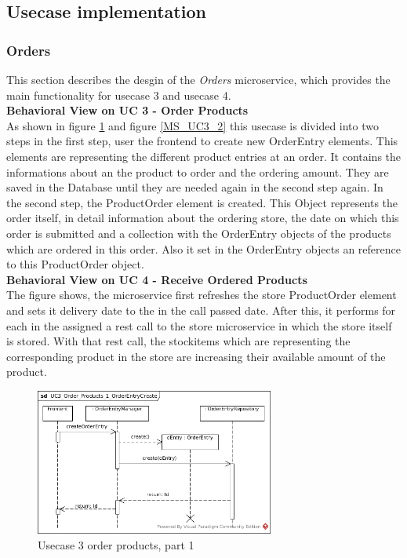 	\subsection{Usecase implementation}\label{UsecaseSection}
	\FloatBarrier
		\subsubsection{Orders}
		This section describes the desgin of the \textit{Orders} microservice, which provides the main functionality for usecase 3 and usecase 4.\\
		
		\textbf{Behavioral View on UC 3 - Order Products} \\
		As shown in figure \ref{MS_UC3_1} and figure \ref{MS_UC3_2} this usecase is divided into two steps in the first step, user the frontend to create new OrderEntry elements. This elements are representing the different product entries at an order. It contains the informations about an the product to order and the ordering amount. They are saved in the Database until they are needed again in the second step again. 
		In the second step, the ProductOrder element is created. This Object represents the order itself, in detail information about the ordering store, the date on which this order is submitted and a collection with the OrderEntry objects of the products which are ordered in this order. Also it set in the OrderEntry objects an reference to this ProductOrder object.\\
		
		\textbf{Behavioral View on UC 4 - Receive Ordered Products} \\
		The figure %
		shows, the microservice first refreshes the store ProductOrder element and sets it delivery date to the in the call passed date.
		After this, it performs for each in the assigned a rest call to the store microservice in which the store itself is stored. With that rest call, the stockitems which are representing the corresponding product in the store are increasing their available amount of the product.
		
			\begin{figure}[!h]
				\centering
				\includegraphics[width = 0.7\textwidth]{img/UC3_Order_Products_1_OrderEntryCreate.jpg}
				\caption{Usecase 3 order products, part 1}
				\label{MS_UC3_1}
			\end{figure}
			
